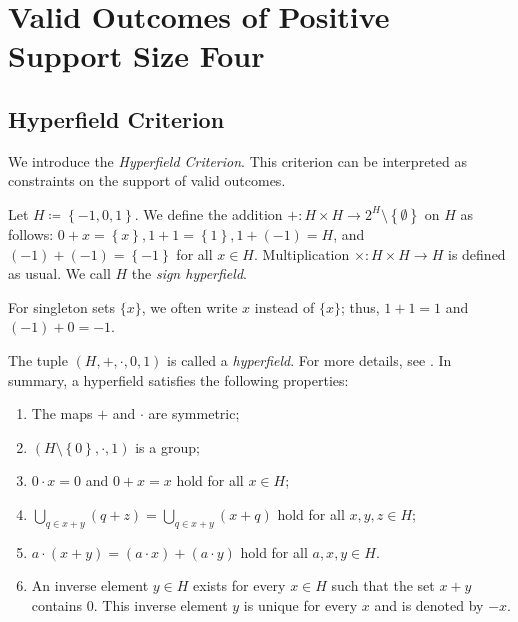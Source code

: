 \chapter{Valid Outcomes of Positive Support
Size Four}

\section{Hyperfield Criterion}

We introduce the \emph{Hyperfield Criterion}. This criterion can be interpreted as constraints on the support of valid outcomes.

\begin{definition}
    Let \( H \coloneqq \left\{ -1, 0, 1 \right\} \). We define the addition \( + : H \times H \to 2^H \setminus \left\{ \emptyset \right\} \) on \( H \) as follows: \( 0 + x = \left\{ x \right\},  1 + 1 = \left\{ 1 \right\},1 + (-1) = H \), and \( (-1) + (-1) = \left\{ -1 \right\} \) for all \( x \in H \).
    Multiplication \( \times : H \times H \to H \) is defined as usual. We call \( H \) the \emph{sign hyperfield}.
\end{definition}

For singleton sets \( \{ x \} \), we often write \( x \) instead of \( \{ x \} \); thus, \( 1 + 1 = 1 \) and \( (-1) + 0 = -1 \).

\begin{remark}
    The tuple \( (H, + , \cdot, 0, 1) \) is called a \emph{hyperfield}. For more details, see \cite{baker2018matroids}. In summary, a hyperfield satisfies the following properties:
    \begin{enumerate}
        \item  The maps \( + \) and \( \cdot \) are symmetric;
        \item \( (H \setminus \left\{ 0 \right\}, \cdot, 1) \) is a group;
        \item \( 0 \cdot x = 0 \) and \( 0 + x = x \) hold for all \( x \in H \);
        \item \( \bigcup_{q \in x+y}(q + z) = \bigcup_{q \in x + y}(x + q) \) hold for all \( x,y,z \in H \);
        \item \( a \cdot (x + y) = (a \cdot x) + (a \cdot y) \) hold for all \( a,x,y \in H \).
        \item An inverse element \( y  \in H\) exists for every \( x \in H\) such that the set \( x + y \) contains \( 0 \). This inverse element \( y \) is unique for every \( x \) and is denoted by \( -x \).
    \end{enumerate}
\end{remark}

